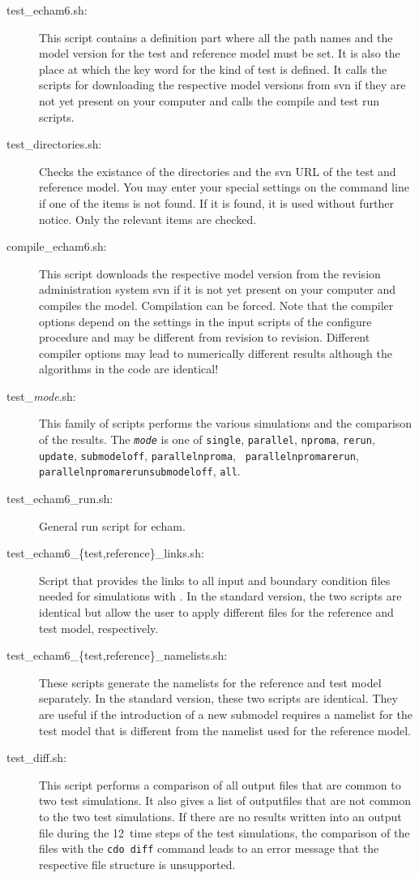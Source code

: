 \begin{description}
\item[test\_echam6.sh:] This script contains a definition part
  where all the path names and the model version for the test and
  reference model must be set. It is also the place at which the key
  word for the kind of test is defined. It calls the scripts for
  downloading the respective model versions from svn if they are not
  yet present on your computer and calls the compile and test run scripts.
\item[test\_directories.sh:] Checks the existance of the directories
  and the svn URL of the test and reference model. You may enter your
  special settings on the command 
  line if one of the items is not found. If it is found, it is used
  without further notice. Only the relevant items are checked. 
\item[compile\_echam6.sh:] This script downloads the respective
  model version from the revision administration system svn if it is
  not yet present on your computer and compiles the model. Compilation
  can be forced. Note that the compiler options depend
  on the settings in the input scripts of the configure procedure
  and may be different from revision to revision. Different compiler
  options may lead to numerically different results although the
  algorithms in the code are identical!
\item[test\_{\textsl{mode}}.sh:] This family of scripts performs the various
  simulations and the comparison of the results. The {\tt\it mode} is
  one of {\tt single}, {\tt parallel}, {\tt nproma}, {\tt rerun}, {\tt update},
  {\tt submodeloff},
  {\tt parallelnproma}, {\tt 
    parallelnpromarerun}, {\tt parallelnpromarerunsubmodeloff}, {\tt all}.
\item[test\_echam6\_run.sh:] General run script for echam. 
\item[test\_echam6\_\{test,reference\}\_links.sh:] Script that
  provides the links to all input and boundary condition files needed
  for simulations with \echam. In the standard version, the two scripts
  are identical but allow the user to apply different files for the
  reference and test model, respectively.
\item[test\_echam6\_\{test,reference\}\_namelists.sh:] These scripts
  generate the namelists for the reference and test model
  separately. In the standard version, these two scripts are
  identical. They are useful if the introduction of a new submodel
  requires a namelist for the test model that is different from the
  namelist used for the reference model.
\item[test\_diff.sh:] This script performs a comparison of all
  output files that are common to two test simulations. It also gives
  a list of outputfiles that are not common to the two test
  simulations. If there are no results written into an output file
  during the 12~time steps of the test simulations, the comparison of
  the files with the {\tt cdo diff} command leads to an error message
  that the respective file structure is unsupported. 
\end{description}

